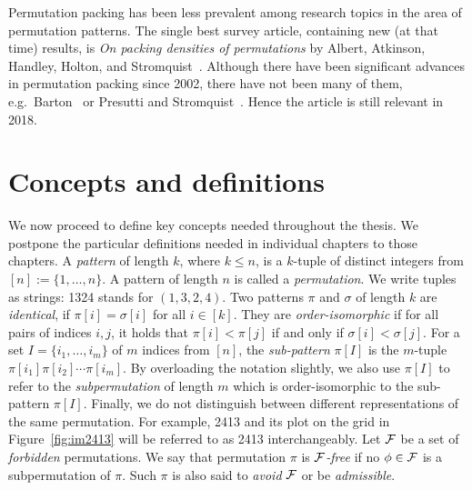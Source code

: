 \documentclass[12pt, a4paper, twoside]{report}
\begin{document}
Permutation packing has been less prevalent among research topics in the area of permutation patterns. The single best survey article, containing new (at that time) results, is \emph{On packing densities of permutations} by Albert, Atkinson, Handley, Holton, and Stromquist~\cite{albert2002packing}. Although there have been significant advances in permutation packing since 2002, there have not been many of them, e.g.~Barton~\cite{barton2004packing} or Presutti and Stromquist~\cite{presutti2010packing}. Hence the article is still relevant in 2018.

\section{Concepts and definitions}
We now proceed to define key concepts needed throughout the thesis. We postpone the particular definitions needed in individual chapters to those chapters. A \emph{pattern} of length $k$, where $k \leq n$, is a $k$-tuple of distinct integers from $[n] :=\{1,\ldots,n\}$. A pattern of length $n$ is called a \emph{permutation}. We write tuples as strings: 1324 stands for $(1,3,2,4)$. Two patterns $\pi$ and $\sigma$ of length $k$ are \emph{identical}, if $\pi[i] = \sigma[i]$ for all $i \in [k]$. They are \emph{order-isomorphic} if for all pairs of indices $i,j$, it holds that $\pi[i] <\pi[j]$ if and only if $\sigma[i] < \sigma[j]$. For a set $I = \{i_1,\ldots,i_m\}$ of $m$ indices from $[n]$, the \emph{sub-pattern} $\pi[I]$ is the $m$-tuple $\pi[i_1]\pi[i_2]\cdots \pi[i_m]$. By overloading the notation slightly, we also use $\pi[I]$ to refer to the \emph{subpermutation} of length $m$ which is order-isomorphic to the sub-pattern $\pi[I]$. Finally, we do not distinguish between different representations of the same permutation. For example, 2413 and its plot on the grid in Figure~\ref{fig:im2413} will be referred to as 2413 interchangeably. Let $\mathcal{F}$ be a set of \emph{forbidden} permutations. We say that permutation $\pi$ is \emph{$\mathcal{F}$-free} if no $\phi\in\mathcal{F}$ is a subpermutation of $\pi$. Such $\pi$ is also said to \emph{avoid} $\mathcal{F}$ or be \emph{admissible}. 
\end{document}
